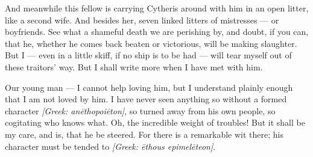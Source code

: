  And meanwhile this fellow is carrying Cytheris around with him in an open litter, like a second wife. And besides her, seven linked litters of mistresses --- or boyfriends. See what a shameful death we are perishing by, and doubt, if you can, that he, whether he comes back beaten or victorious, will be making slaughter. But I --- even in a little skiff, if no ship is to be had --- will tear myself out of these traitors' way. But I shall write more when I have met with him.

 Our young man --- I cannot help loving him, but I understand plainly enough that I am not loved by him. I have never seen anything so without a formed character \textit{[Greek: an\=ethopoi\=eton]}, so turned away from his own people, so cogitating who knows what. Oh, the incredible weight of troubles! But it shall be my care, and is, that he be steered. For there is a remarkable wit there; his character must be tended to \textit{[Greek: \=ethous epimel\=eteon]}.
